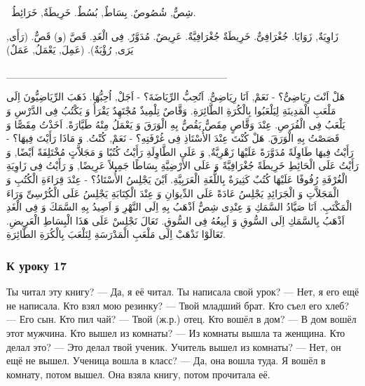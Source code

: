 \documentclass[a5paper]{article}
\begin{document}
\ شِصٌّ, شُصُوصٌ. بِسَاطٌ, بُسُطٌ. خَرِيطَةٌ, خَرَائِطُ. 

زَاوِيَةٌ, زَوَايَا. جُغْرَافِىٌّ. خَرِيطَةٌ جُغْرَافِيَّةٌ. عَرِيضٌ. مُدَوَّرٌ. فِى الْغَدِ. قَصَّ (و) قَصٌّ. (رَأَى, يَرَى, رُؤْيَةٌ). (عَمِلَ, يَعْمَلُ, عَمَلٌ)

\_\_\_\_\_\_\_\_\_\_\_\_\_\_\_\_\_\_\_\_\_\_\_\_\_\_\_\_\_\_

هَلْ اَنْتَ رِيَاضِىٌّ؟ - نَعَمْ, اَنَا رِيَاضِىٌّ. اَتُحِبُّ الرِّيَاضَةَ؟ - اَجَلْ, اُحِبُّهَا. ذَهَبَ الرِّيَاضِيُّونَ اِلَى مَلْعَبِ الْمَدِينَةِ لِيَلْعَبُوا بِالْكُرَةِ الطَّائِرَةِ. وَقَّاصٌ تِلْمِيذٌ مُجْتَهِدٌ يَقْرَأُ وَ يَكْتُبُ فِى الدَّرْسِ وَ يَلْعَبُ فِى الْفُرَصِ. عِنْدَ وَقَّاصٍ مِقَصٌّ يَقُصُّ بِهِ الْوَرَقَ وَ يَعْمَلُ مِنْهُ طَيَّارَةً. اَخَذْتُ مِقَصًّا وَ قَصَصْتُ بِهِ الْوَرَقَ. هَلْ كُنْتَ عِنْدَ الأُسْتَاذِ فِى غُرْفَتِهِ؟ - نَعَمْ, كُنْتُ. وَ مَاذَا رَأَيْتَ فِيهَا؟ - رَأَيْتُ فِيهَا طَاوِلَةً مُدَوَّرَةً عَلَيْهَا زَهْرِيَّةٌ, وَ عَلَى الطَّاوِلَةِ رَأَيْتُ كُتُبًا وَ مَجَلاَّتٍ مُخْتَلِفَةً اَيْضًا, وَ رَأَيْتُ عَلَى الْحَائِطِ خَرِيطَةً جُغْرَافِيَّةً وَ عَلَى الأَرْضِيَّةِ بِسَاطًا جَمِيلاً عَرِيضًا, وَ رَأَيْتُ فِى زَاوِيَةِ الْغُرْفَةِ رُفُوفًا عَلَيْهَا كُتُبٌ كَثِيرَةٌ بِاللُّغَةِ الْعَرَبِيَّةِ. اَيْنَ يَجْلِسُ الأُسْتَاذُ؟ - عِنْدَ قِرَاءَةِ الْكُتُبِ وَ الْمَجَلاَّتِ وَ الْجَرَائِدِ يَجْلِسُ عَادَةً عَلَى الدِّيوَانِ وَ عِنْدَ الْكِتَابَةِ يَجْلِسُ عَلَى الْكُرْسِىِّ وَرَاءَ الْمَكْتَبِ. اَنَا صَيَّادُ السَّمَكِ وَ عِنْدِى شِصٌّ اَذْهَبُ بِهِ اِلَى النَّهْرِ وَ اَصِيدُ بِهِ السَّمَكَ وَ فِى الْغَدِ اَذْهَبُ بِالسَّمَكِ اِلَى السُّوقِ وَ اَبِيعُهُ فِى السُّوقِ. تَعَالَ نَجْلِسْ عَلَى هَذَا الْبِسَاطِ الْعَرِيضِ. تَعَالَوْا نَذْهَبْ اِلَى مَلْعَبِ الْمَدْرَسَةِ لِنَلْعَبَ بِالْكُرَةِ الطَّائِرَةِ. 

\subsubsection{К уроку 17}
Ты читал эту книгу? — Да, я её читал. Ты написала свой урок? — Нет, я его ещё не написала. Кто взял мою резинку? — Твой младший брат. Кто съел его хлеб? — Его сын. Кто пил чай? — Твой (ж.р.) отец. Кто вошёл в дом? — В дом вошёл этот мужчина. Кто вышел из комнаты? — Из комнаты вышла та женщина. Кто делал это? — Это делал твой ученик. Учитель вышел из комнаты? — Нет, он ещё не вышел. Ученица вошла в класс? — Да, она вошла туда. Я вошёл в комнату, потом вышел. Она взяла книгу, потом прочитала её.
\end{document}
